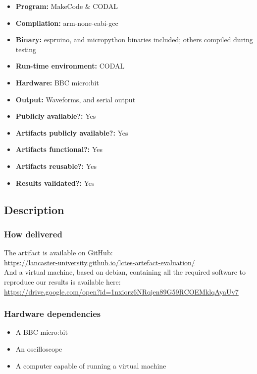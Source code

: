 {\small
\begin{itemize}
  \item {\bf Program:} MakeCode \& CODAL
  \item {\bf Compilation:} arm-none-eabi-gcc
  \item {\bf Binary:} espruino, and micropython binaries included; others compiled during testing
  \item {\bf Run-time environment:} CODAL
  \item {\bf Hardware:} BBC micro:bit
  \item {\bf Output:} Waveforms, and serial output
  \item {\bf Publicly available?:} Yes
  \item {\bf Artifacts publicly available?:} Yes
  \item {\bf Artifacts functional?:} Yes
  \item {\bf Artifacts reusable?:} Yes
  \item {\bf Results validated?:} Yes
\end{itemize}

\subsection{Description}

\subsubsection{How delivered}

The artifact is available on GitHub:\\[5pt]\url{https://lancaster-university.github.io/lctes-artefact-evaluation/}\\[5pt] And a virtual machine, based on debian, containing all the required software to reproduce our results is available here:\\[5pt]\url{https://drive.google.com/open?id=1nxiorz6NRqjen89G59RCOEMklqAyaUv7}

\subsubsection{Hardware dependencies}

\begin{itemize}
    \item A BBC micro:bit
    \item An oscilloscope
    \item A computer capable of running a virtual machine
\end{itemize}

}
